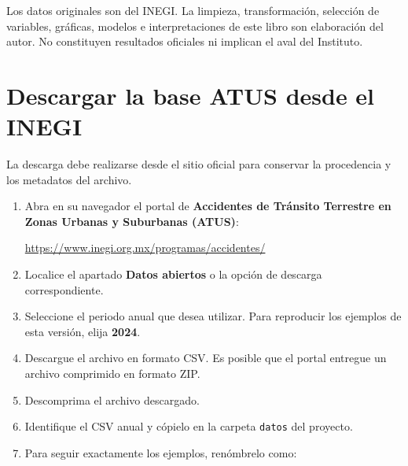 \documentclass[
  spanish,
  10.5pt,
  letterpaper,
  openany,
  headings=big]{scrbook}
\begin{document}
\begin{tcolorbox}[enhanced jigsaw, arc=.35mm, bottomrule=.15mm, bottomtitle=1mm, breakable, colback=white, colbacktitle=quarto-callout-important-color!10!white, colframe=quarto-callout-important-color-frame, coltitle=black, left=2mm, leftrule=.75mm, opacityback=0, opacitybacktitle=0.6, rightrule=.15mm, title=\textcolor{quarto-callout-important-color}{\faExclamation}\hspace{0.5em}{Uso responsable de la información}, titlerule=0mm, toprule=.15mm, toptitle=1mm]

Los datos originales son del INEGI. La limpieza, transformación,
selección de variables, gráficas, modelos e interpretaciones de este
libro son elaboración del autor. No constituyen resultados oficiales ni
implican el aval del Instituto.

\end{tcolorbox}

\section{Descargar la base ATUS desde el
INEGI}\label{descargar-la-base-atus-desde-el-inegi}

La descarga debe realizarse desde el sitio oficial para conservar la
procedencia y los metadatos del archivo.

\begin{enumerate}
\def\labelenumi{\arabic{enumi}.}
\item
  Abra en su navegador el portal de \textbf{Accidentes de Tránsito
  Terrestre en Zonas Urbanas y Suburbanas (ATUS)}:

  \url{https://www.inegi.org.mx/programas/accidentes/}
\item
  Localice el apartado \textbf{Datos abiertos} o la opción de descarga
  correspondiente.
\item
  Seleccione el periodo anual que desea utilizar. Para reproducir los
  ejemplos de esta versión, elija \textbf{2024}.
\item
  Descargue el archivo en formato CSV. Es posible que el portal entregue
  un archivo comprimido en formato ZIP.
\item
  Descomprima el archivo descargado.
\item
  Identifique el CSV anual y cópielo en la carpeta \texttt{datos} del
  proyecto.
\item
  Para seguir exactamente los ejemplos, renómbrelo como:
\end{enumerate}
\end{document}
